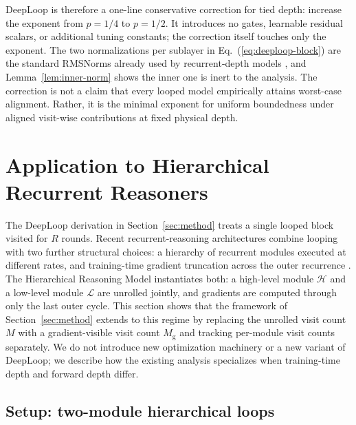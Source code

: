 \documentclass[11pt]{airesearch}
\begin{document}
DeepLoop is therefore a one-line conservative correction for tied depth:
increase the exponent from $p=1/4$ to $p=1/2$. It introduces no gates,
learnable residual scalars, or additional tuning constants; the correction
itself touches only the exponent. The two normalizations per sublayer in
Eq.~(\ref{eq:deeploop-block}) are the standard RMSNorms already used by
recurrent-depth models \citep{geiping2025scaling}, and
Lemma~\ref{lem:inner-norm} shows the inner one is inert to the analysis. The correction is not a claim that every looped model empirically attains worst-case alignment. Rather, it is the minimal exponent for uniform boundedness under aligned visit-wise contributions at fixed physical depth.

\section{Application to Hierarchical Recurrent Reasoners}
\label{sec:hrm}

The DeepLoop derivation in Section~\ref{sec:method} treats a single looped
block visited for $R$ rounds. Recent recurrent-reasoning architectures combine
looping with two further structural choices: a hierarchy of recurrent modules
executed at different rates, and training-time gradient truncation across the
outer recurrence \citep{wang2025hrm,geiping2025scaling}. The Hierarchical
Reasoning Model \citep{wang2025hrm} instantiates both: a high-level module
$\mathcal{H}$ and a low-level module $\mathcal{L}$ are unrolled jointly, and 
gradients are computed through only the last outer cycle. This section shows
that the framework of Section~\ref{sec:method} extends to this regime by
replacing the unrolled visit count $M$ with a gradient-visible visit count
$M_{\mathrm{g}}$ and tracking per-module visit counts separately. We do not
introduce new optimization machinery or a new variant of DeepLoop; we describe
how the existing analysis specializes when training-time depth and forward
depth differ.

\subsection{Setup: two-module hierarchical loops}
\label{sec:hrm:setup}
\end{document}
